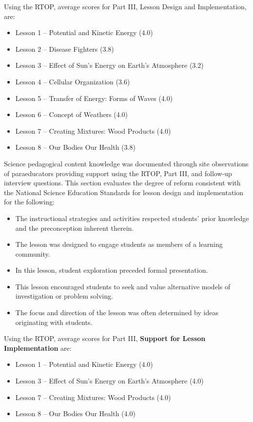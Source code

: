 \documentclass[11.5pt]{sig-alternate} %
\begin{document}
\begin{large}
Using the RTOP, average scores for Part III, Lesson Design and Implementation, are: 

\begin{itemize}
    \item Lesson 1 – Potential and Kinetic Energy (4.0)
    \item Lesson 2 – Disease Fighters (3.8)
    \item Lesson 3 – Effect of Sun’s Energy on Earth’s Atmosphere (3.2)
    \item Lesson 4 – Cellular Organization (3.6)
    \item Lesson 5 – Transfer of Energy: Forms of Waves (4.0)
    \item Lesson 6 – Concept of Weathers (4.0)
    \item Lesson 7 – Creating Mixtures: Wood Products (4.0)
    \item Lesson 8 – Our Bodies Our Health (3.8)
\end{itemize}

Science pedagogical content knowledge was documented through site observations of paraeducators providing support using the RTOP, Part III, and follow-up interview questions. This section evaluates the degree of reform consistent with the National Science Education Standards for lesson design and implementation for the following:

\begin{itemize}
    \item The instructional strategies and activities respected students’ prior knowledge and the preconception inherent therein.
    \item The lesson was designed to engage students as members of a learning community.
    \item In this lesson, student exploration preceded formal presentation.
    \item This lesson encouraged students to seek and value alternative models of investigation or problem solving.
    \item The focus and direction of the lesson was often determined by ideas originating with students.
\end{itemize}

Using the RTOP, average scores for Part III, \textbf{Support for Lesson Implementation} are: 

\begin{itemize}
    \item Lesson 1 – Potential and Kinetic Energy (4.0)
    \item Lesson 3 – Effect of Sun’s Energy on Earth’s Atmosphere (4.0)
    \item Lesson 7 – Creating Mixtures: Wood Products (4.0)
    \item Lesson 8 – Our Bodies Our Health (4.0)
\end{itemize}


\end{large}
\end{document}
